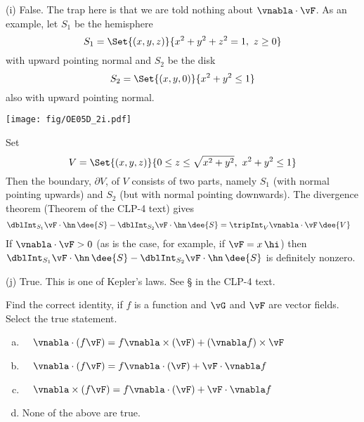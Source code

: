 \begin{solution}
(i) False. The trap here is that we are told nothing about $\vnabla\cdot\vF$.
As an example, let $S_1$ be the hemisphere
\begin{equation*}
S_1=\Set{(x,y,z)}{x^2+y^2+z^2=1,\ z\ge 0}
\end{equation*}
with upward pointing normal and $S_2$ be the disk
\begin{equation*}
S_2=\Set{(x,y,0)}{x^2+y^2\le 1}
\end{equation*}
also with upward pointing normal.

\begin{center}
       \texttt{[image: fig/OE05D\_2i.pdf]}
\end{center}

Set
\begin{equation*}
V=\Set{(x,y,z)}{0\le z\le \sqrt{x^2+y^2},\ x^2+y^2\le 1}
\end{equation*}
Then the boundary, $\partial V$, of $V$ consists of two parts, namely $S_1$
(with normal pointing upwards) and $S_2$ (but with normal pointing downwards).  The divergence theorem (Theorem  of the CLP-4 text) 
gives
\begin{align*}
\dblInt_{S_1} \vF \cdot \hn\,\dee{S}
-\dblInt_{S_2} \vF \cdot \hn\,\dee{S}
&=\tripInt_V \vnabla\cdot\vF\,\dee{V}
\end{align*}
If $\vnabla\cdot\vF>0$ (as is the case, for example, if $\vF=x\,\hi$)
then $\dblInt_{S_1} \vF \cdot \hn\,\dee{S}
-\dblInt_{S_2} \vF \cdot \hn\,\dee{S}$ is definitely nonzero.

(j) True. This is one of Kepler's laws. See \S{}
in the CLP-4 text.


\end{solution}

\begin{question}[M317 2005D] %
Find the correct identity, if $f$ is a function and $\vG$ and $\vF$ 
are vector fields. Select the true statement.
\begin{enumerate}[(a)]
\item\ \ 
$\vnabla\cdot(f \vF) = f \vnabla\times(\vF) + (\vnabla f ) \times\vF$
\item\ \ 
$\vnabla\cdot(f \vF) = f \vnabla\cdot(\vF) + \vF\cdot \vnabla f$
\item\ \ 
$\vnabla\times(f \vF) = f \vnabla\cdot(\vF) + \vF\cdot \vnabla f$
\item
None of the above are true.
\end{enumerate}
\end{question}

